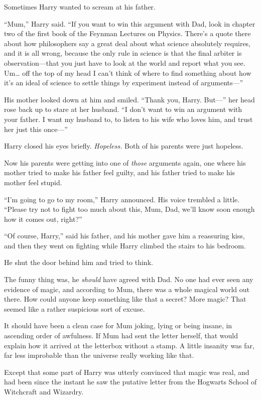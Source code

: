 Sometimes Harry wanted to scream at his father.

``Mum,'' Harry said. ``If you want to win this argument with Dad, look
in chapter two of the first book of the Feynman Lectures on Physics.
There's a quote there about how philosophers say a great deal about what
science absolutely requires, and it is all wrong, because the only rule
in science is that the final arbiter is observation---that you just have
to look at the world and report what you see. Um\ldots{} off the top of
my head I can't think of where to find something about how it's an ideal
of science to settle things by experiment instead of arguments---''

His mother looked down at him and smiled. ``Thank you, Harry. But---''
her head rose back up to stare at her husband. ``I don't want to win an
argument with your father. I want my husband to, to listen to his wife
who loves him, and trust her just this once---''

Harry closed his eyes briefly. \emph{Hopeless.} Both of his parents were
just hopeless.

Now his parents were getting into one of \emph{those} arguments again,
one where his mother tried to make his father feel guilty, and his
father tried to make his mother feel stupid.

``I'm going to go to my room,'' Harry announced. His voice trembled a
little. ``Please try not to fight too much about this, Mum, Dad, we'll
know soon enough how it comes out, right?''

``Of course, Harry,'' said his father, and his mother gave him a
reassuring kiss, and then they went on fighting while Harry climbed the
stairs to his bedroom.

He shut the door behind him and tried to think.

The funny thing was, he \emph{should} have agreed with Dad. No one had
ever seen any evidence of magic, and according to Mum, there was a whole
magical world out there. How could anyone keep something like that a
secret? More magic? That seemed like a rather suspicious sort of excuse.

It should have been a clean case for Mum joking, lying or being insane,
in ascending order of awfulness. If Mum had sent the letter herself,
that would explain how it arrived at the letterbox without a stamp. A
little insanity was far, far less improbable than the universe really
working like that.

Except that some part of Harry was utterly convinced that magic was
real, and had been since the instant he saw the putative letter from the
Hogwarts School of Witchcraft and Wizardry.

